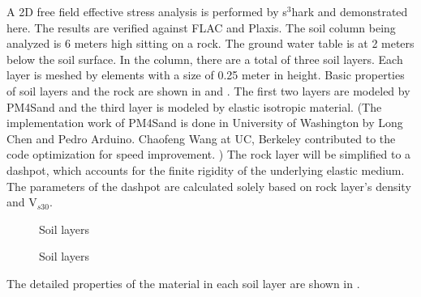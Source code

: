 A 2D free field effective stress analysis is performed by s$^3$hark
and demonstrated here.  The results are verified against FLAC and
Plaxis.  The soil column being analyzed is 6 meters high sitting on a
rock.  The ground water table is at 2 meters below the soil surface.
In the column, there are a total of three soil layers. Each layer is
meshed by elements with a size of 0.25 meter in height.  Basic
properties of soil layers and the rock are shown
in  and .  The
first two layers are modeled by PM4Sand and the third layer is modeled
by elastic isotropic material.  (The implementation work of
PM4Sand \cite{boulanger2015pm4sand} is done in University of
Washington by Long Chen and Pedro Arduino.  Chaofeng Wang at UC,
Berkeley contributed to the code optimization for speed improvement. )
The rock layer will be simplified to a \cite{Lysmer:1969} dashpot,
which accounts for the finite rigidity of the underlying elastic
medium.  The parameters of the dashpot are calculated solely based on
rock layer's density and V$_{s30}$.


\begin{figure}[!htbp]
  \caption{Soil layers }
  \label{fig:s3harkSoilColumn}
\end{figure}


\begin{figure}[!htbp]
  \caption{Soil layers }
  \label{fig:s3hark5}
\end{figure}


The detailed properties of the material in each soil layer are shown in .

